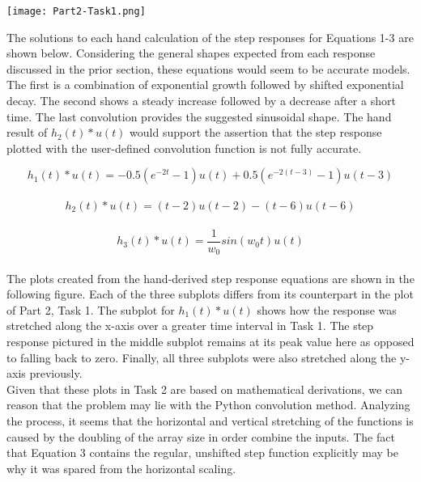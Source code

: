 \documentclass[12pt]{report}
\begin{document}
\begin{center}
	\texttt{[image: Part2-Task1.png]}\\[1.0 cm]
\end{center}

The solutions to each hand calculation of the step responses for Equations 1-3 are shown below. Considering the general shapes expected from each response discussed in the prior section, these equations would seem to be accurate models. The first is a combination of exponential growth followed by shifted exponential decay. The second shows a steady increase followed by a decrease after a short time. The last convolution provides the suggested sinusoidal shape. The hand result of $ h_2(t) * u(t) $ would support the assertion that the step response plotted with the user-defined convolution function is not fully accurate.

\begin{equation*}
	h_1(t) * u(t) = -0.5(e^{-2t} - 1)u(t) + 0.5(e^{-2(t - 3)} - 1)u(t - 3)
\end{equation*} \\
\begin{equation*}
	h_2(t) * u(t) =	(t - 2)u(t - 2) - (t - 6)u(t - 6)
\end{equation*} \\
\begin{equation*}
	h_3(t) * u(t) =	\frac{1}{w_0} sin(w_0t)u(t)
\end{equation*} \\

The plots created from the hand-derived step response equations are shown in the following figure. Each of the three subplots differs from its counterpart in the plot of Part 2, Task 1. The subplot for $ h_1(t) * u(t) $ shows how the response was stretched along the x-axis over a greater time interval in Task 1. The step response pictured in the middle subplot remains at its peak value here as opposed to falling back to zero. Finally, all three subplots were also stretched along the y-axis previously. \\

Given that these plots in Task 2 are based on mathematical derivations, we can reason that the problem may lie with the Python convolution method. Analyzing the process, it seems that the horizontal and vertical stretching of the functions is caused by the doubling of the array size in order combine the inputs. The fact that Equation 3 contains the regular, unshifted step function explicitly may be why it was spared from the horizontal scaling. \\
\end{document}
